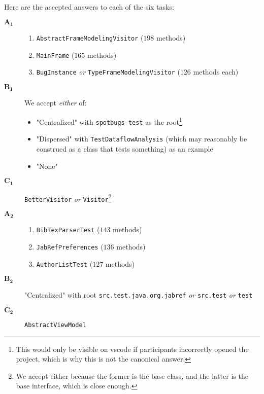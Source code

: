 Here are the accepted answers to each of the six tasks:
\begin{description}
	\item[$\bm{A_1}$]
	      \begin{enumerate}
		      \item \texttt{AbstractFrameModelingVisitor} ($198$ methods)
		      \item \texttt{MainFrame} ($165$ methods)
		      \item \texttt{BugInstance} \emph{or} \texttt{TypeFrameModelingVisitor} ($126$ methods each)
	      \end{enumerate}
	\item[$\bm{B_1}$] We accept \emph{either} of:
	      \begin{itemize}
		      \item "Centralized" with \texttt{spotbugs-test} as the root\footnote{
			            This would only be visible on \gls{vscode} if participants incorrectly opened the project, which is why this is not the canonical answer.
		            }
		      \item "Dispersed" with \texttt{TestDataflowAnalysis} (which may reasonably be construed as a class that tests something) as an example
		      \item "None"
	      \end{itemize}
	\item[$\bm{C_1}$] \texttt{BetterVisitor} \emph{or} \texttt{Visitor}\footnote{
		      We accept either because the former is the base class, and the latter is the base interface, which is close enough.
	      }
	\item[$\bm{A_2}$]
	      \begin{enumerate}
		      \item \texttt{BibTexParserTest} ($143$ methods)
		      \item \texttt{JabRefPreferences} ($136$ methods)
		      \item \texttt{AuthorListTest} ($127$ methods)
	      \end{enumerate}
	\item[$\bm{B_2}$] "Centralized" with root \texttt{src.test.java.org.jabref} \emph{or} \texttt{src.test} \emph{or} \texttt{test}
	\item[$\bm{C_2}$] \texttt{AbstractViewModel}
\end{description}
